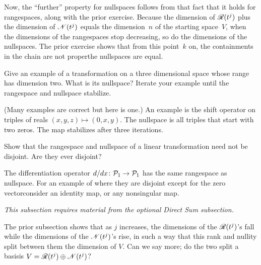 \begin{exercises}
\begin{answer}
      Now, 
      the ``further'' property for nullspaces follows from that fact
      that it holds for rangespaces, along with the prior exercise.
      Because the dimension of $\mathscr{R}(t^j)$ plus the dimension of
      $\mathscr{N}(t^j)$ equals the dimension~$n$ of the starting space~$V$,
      when the dimensions of the rangespaces stop decreasing, so do the
      dimensions of the nullspaces.
      The prior exercise shows that from this point~$k$ on, 
      the containments in the chain are not proper\Dash the nullspaces 
      are equal. 
    \end{answer}
  \recommended\item
    Give an example of a transformation on a three
    dimensional space whose range has dimension two.
    What is its nullspace?
    Iterate your example until the rangespace and nullspace stabilize.
    \begin{answer}
      (Many examples are correct but here is one.) 
      An example is the shift operator on triples of reals
      \( (x,y,z)\mapsto (0,x,y) \).
      The nullspace is all triples that start with two zeros.
      The map stabilizes after three iterations.
     \end{answer}
  \item 
      Show that the rangespace and nullspace of a linear transformation
      need not be disjoint.
      Are they ever disjoint?
      \begin{answer}
        The differentiation operator
        \( \mbox{$d/dx\colon \mathcal{P}_1\to \mathcal{P}_1$} \) has the same
        rangespace as nullspace.
        For an example of where they are disjoint\Dash
        except for the zero vector\Dash consider an identity map,
        or any nonsingular map. 
      \end{answer}
\end{exercises}

















\noindent\textit{This subsection requires material from the 
    optional Direct Sum subsection.}

The prior subsection shows that as \( j \) increases,
the dimensions of the $\mathscr{R}(t^j)$'s fall while
the dimensions of the $\mathscr{N}(t^j)$'s rise, 
in such a way that this rank and nullity split between them 
the dimension of $V$.
Can we say more;
do the two split a basis\Dash is
\( V=\mathscr{R}(t^j)\oplus\mathscr{N}(t^j) \)?

